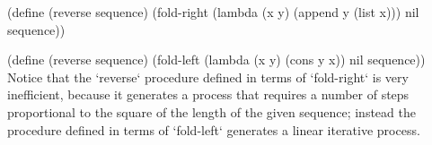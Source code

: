 \begtt\scm
(define (reverse sequence)
  (fold-right (lambda (x y) (append y (list x))) nil sequence))

(define (reverse sequence)
  (fold-left (lambda (x y) (cons y x)) nil sequence))
\endtt
Notice that the `reverse` procedure defined in terms of `fold-right` is very inefficient, because it generates a process that requires a number of steps proportional to the square of the length of the given sequence;  instead the procedure defined in terms of `fold-left` generates a linear iterative process.
